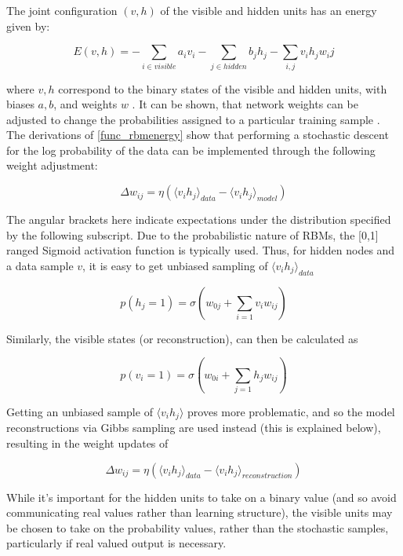 \documentclass[a4paper,11pt,oneside]{article}
\theoremstyle{plain}
\theoremstyle{definition}
\begin{document}
The joint configuration $(v,h)$ of the visible and hidden units has an energy given by:

\begin{equation}\label{func_rbmenergy}
E(v,h) = - \sum_{i \in visible} a_iv_i - \sum_{j \in hidden} b_jh_j - \sum_{i,j}v_ih_jw_ij
\end{equation}

where $v,h$ correspond to the binary states of the visible and hidden units, with biases $a,b$, and weights $w$ \cite{Hinton5}. It can be shown, that network weights can be adjusted to change the probabilities assigned to a particular training sample \cite{Hinton5}. The derivations of \ref{func_rbmenergy} show that performing a stochastic descent for the log probability of the data can be implemented through the following weight adjustment:

\begin{equation}
\Delta w_{ij} = \eta (\langle v_ih_j\rangle_{data} - \langle v_ih_j\rangle_{model})
\end{equation}

The angular brackets here indicate expectations under the distribution specified by the following subscript. Due to the probabilistic nature of RBMs, the [0,1] ranged Sigmoid activation function is typically used. Thus, for hidden nodes and a data sample $v$, it is easy to get unbiased sampling of $\langle v_ih_j \rangle_{data}$

\begin{equation}
p(h_j=1) = \sigma(w_{0j} +  \sum_{i=1}v_iw_{ij})
\end{equation}

Similarly, the visible states (or reconstruction), can then be calculated as 

\begin{equation}
p(v_i=1) = \sigma(w_{0i} + \sum_{j=1}h_jw_{ij})
\end{equation}


Getting an unbiased sample of $\langle v_i h_j \rangle$ proves more problematic, and so the model reconstructions via Gibbs sampling are used instead (this is explained below), resulting in the weight updates of

\begin{equation}
\Delta w_{ij} = \eta (\langle v_ih_j\rangle_{data} - \langle v_ih_j\rangle_{reconstruction})
\end{equation}

While it's important for the hidden units to take on a binary value (and so avoid communicating real values rather than learning structure), the visible units may be chosen to take on the probability values, rather than the stochastic samples, particularly if real valued output is necessary. 
\end{document}
